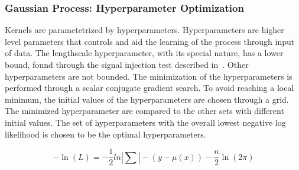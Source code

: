     \subsubsection{Gaussian Process: Hyperparameter Optimization}
    \label{sec:hyperparam}
    Kernels are parametetrized by hyperparameters. Hyperparameters are higher level parameters that controls and aid the learning of the process through input of data. The lengthscale hyperparameter, with its special nature, has a lower bound, found through the signal injection test described in~\cite{ATL-PHYS-PUB-2020-028}. Other hyperparameters are not bounded. The minimization of the hyperparameters is performed through a scalar conjugate gradient search. To avoid reaching a local minimum, the initial values of the hyperparameters are chosen through a grid. The minimized hyperparameter are compared to the other sets with different initial values. The set of hyperparameters with the overall lowest negative log likelihood is chosen to be the optimal hyperparameters.

    \begin{equation}
        -\ln(L) = -\frac{1}{2} ln |\sum| - (y-\mu(x) ) - \frac{n}{2}\ln(2\pi)
    \label{eq:loglikelihood}
    \end{equation}
    

%

